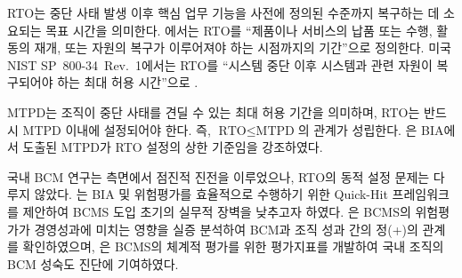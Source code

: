 RTO는 중단 사태 발생 이후 핵심 업무 기능을
사전에 정의된 수준까지 복구하는 데 소요되는 목표 시간을 의미한다.
에서는 RTO를 ``제품이나 서비스의 납품 또는 수행, 활동의 재개,
또는 자원의 복구가 이루어져야 하는 시점까지의 기간''으로 정의한다.
미국 NIST SP~800-34~Rev.~1에서는 RTO를 ``시스템 중단 이후 시스템과 관련 자원이
복구되어야 하는 최대 허용 시간''으로 \citep{nist800-34r1}.

MTPD는 조직이 중단 사태를
견딜 수 있는 최대 허용 기간을 의미하며, RTO는 반드시 MTPD 이내에 설정되어야 한다.
즉, $\text{RTO} \leq \text{MTPD}$의 관계가 성립한다.
\citet{hiles2010bcm}은 BIA에서 도출된 MTPD가 RTO 설정의 상한 기준임을
강조하였다.

국내 BCM 연구는  측면에서 점진적 진전을 이루었으나, RTO의 동적 설정 문제는 다루지 않았다.
\citet{cheung2019quickhit}는 BIA 및 위험평가를
효율적으로 수행하기 위한 Quick-Hit 프레임워크를 제안하여 BCMS 도입 초기의
실무적 장벽을 낮추고자 하였다. \citet{jang2021bcms}은 BCMS의 위험평가가
경영성과에 미치는 영향을 실증 분석하여 BCM과 조직 성과 간의
정(+)의 관계를 확인하였으며, \citet{jung2023bcms}은 BCMS의 체계적 평가를 위한
평가지표를 개발하여 국내 조직의 BCM 성숙도 진단에 기여하였다.

